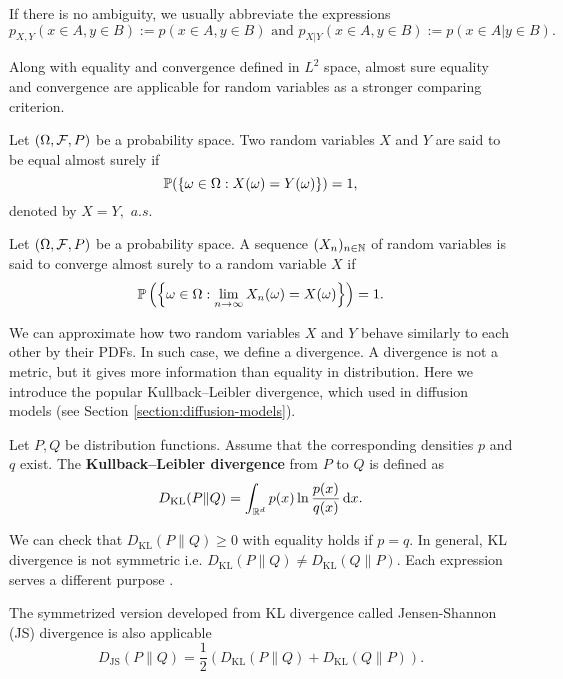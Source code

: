 \begin{remark}
  If there is no ambiguity, we usually abbreviate the expressions
  $$p_{X,Y}(x\in A,y\in B) := p(x\in A,y\in B) \text{ and } p_{X|Y}(x\in A,y\in B) := p(x\in A|y\in B).$$
\end{remark}

Along with equality and convergence defined in $L^2$ space, almost sure equality and convergence are applicable for random variables as a stronger comparing criterion.

\begin{definition}
  Let $(\Omega, \mathcal{F}, P)$ be a probability space. Two random variables $X$ and $Y$ are said to be equal almost surely if
  $$\mathbb{P}(\{\omega\in\Omega : X(\omega)=Y(\omega)\})=1,$$
  denoted by $X=Y, \,\,a.s.$
\end{definition}

\begin{definition}
  Let $(\Omega, \mathcal{F}, P)$ be a probability space. A sequence $(X_n)_{n\in \mathbb{N}}$ of random variables is said to converge almost surely to a random variable $X$ if
  $$\mathbb{P}\left(\left\{\omega\in\Omega : \lim\limits_{n\to\infty}X_n(\omega)=X(\omega)\right\}\right)=1.$$
\end{definition}

We can approximate how two random variables $X$ and $Y$ behave similarly to each other by their PDFs. In such case, we define a divergence. A divergence is not a metric, but it gives more information than equality in distribution. Here we introduce the popular Kullback–Leibler divergence, which used in diffusion models (see Section \ref{section:diffusion-models}).

\begin{definition}
  \label{definition:KL-divergence}
  Let $P,Q$ be distribution functions. Assume that the corresponding densities $p$ and $q$ exist. The \textbf{Kullback–Leibler divergence} from $P$ to $Q$ is defined as
  \begin{equation}
    D_{\mathrm{KL}}(P\|Q) = \int_{\mathbb{R}^d} p(x)\ln\dfrac{p(x)}{q(x)}\,\mathrm{d} x.
  \end{equation}
\end{definition}

\begin{remark}
  We can check that $D_{\mathrm{KL}}(P\|Q)\ge0$ with equality holds if $p=q$. In general, KL divergence is not symmetric i.e. $D_{\mathrm{KL}}(P\|Q)\ne D_{\mathrm{KL}}(Q\|P).$ Each expression serves a different purpose \cite{bishop2006pattern}.

  The symmetrized version developed from KL divergence called Jensen-Shannon (JS) divergence is also applicable
  \begin{equation}
    D_{\mathrm{JS}}(P\|Q) = \dfrac{1}{2}\left(D_{\mathrm{KL}}(P\|Q) + D_{\mathrm{KL}}(Q\|P)\right).
  \end{equation}
\end{remark}

